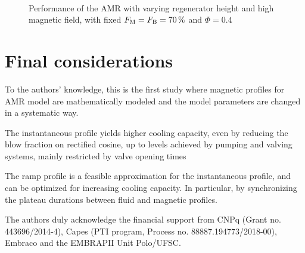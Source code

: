 \documentclass[referee]{svjour3}
\begin{document}
\begin{figure}[!ht]
  \centering
{}
\,
  \caption{Performance of the AMR with varying regenerator height and high magnetic field, with fixed $F_{\mathrm{M}} = F_{\mathrm{B}} = \SI{70}{\percent}$ and $\Phi = 0.4$}
  \label{fig:qc-cop-eta-amr-height}
\end{figure}


\section{Final considerations}
\label{sec:final-considerations}

To the authors' knowledge, this is the first study where magnetic profiles for AMR model are mathematically modeled and the model parameters are changed in a systematic way.

The instantaneous profile yields higher cooling capacity, even by
reducing the blow fraction on rectified cosine, up to levels achieved by pumping and valving systems, mainly restricted by valve opening times

The ramp profile is a feasible approximation for the instantaneous
profile, and can be optimized for increasing cooling capacity.
In particular, by synchronizing the plateau durations between fluid
and magnetic profiles.

\begin{acknowledgements}
The authors duly acknowledge the financial support from CNPq (Grant no. 443696/2014-4), Capes (PTI program, Process no. 88887.194773/2018-00), Embraco and the EMBRAPII Unit Polo/UFSC.
\end{acknowledgements}



\end{document}

